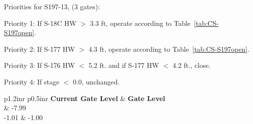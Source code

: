 Priorities for S197-13, (3 gates):
\begin{packed_items}
\item Priority 1: If S-18C HW $>$ 3.3 ft, operate according to Table~\ref{tab:CS-S197open}.
\item Priority 2: If S-177 HW $>$ 4.3 ft, operate according to Table~\ref{tab:CS-S197open}.
\item Priority 3: If S-176 HW $<$ 5.2 ft. and if S-177 HW $<$ 4.2 ft., close.
\item Priority 4: If stage $<$ 0.0, unchanged.
\end{packed_items}


\footnotesize
\begin{table}[!h]
\centering
\caption{Control strategy for S197 open (units are ft. NGVD29)}
\label{tab:CS-S197open}
\begin{tabular}{p{1.2in}{r} p{0.5in}{r}}
\hline
\textbf{Current Gate Level} & \textbf{Gate Level}\\
	& -7.99       \\
-1.01	& -1.00   \\
\hline
\end{tabular}
\end{table}
\normalsize


